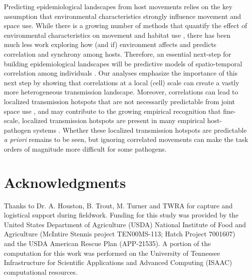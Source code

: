 \documentclass[letterpaper]{article}
\begin{document}
Predicting epidemiological landscapes from host movements relies on the key assumption that environmental characteristics strongly influence movement and space use. While there is a growing number of methods that quantify the effect of environmental characteristics on movement and habitat use \citep[reviewed in][]{Hooten2017a}, there has been much less work exploring how (and if) environment affects and predicts correlation and synchrony among hosts.  Therefore, an essential next-step for building epidemiological landscapes will be predictive models of spatio-temporal correlation among individuals \citep[e.g.][]{Brandell2021}.
Our analyses emphasize the importance of this next step by showing that correlations at a local (cell) scale can create a vastly more heterogeneous transmission landscape. Moreover, correlations can lead to localized transmission hotspots that are not necessarily predictable from joint space use \citep{Yang2023a}, and may contribute to the growing empirical recognition that fine-scale, localized transmission hotspots are present in many empirical host-pathogen systems \citep{Albery2021}.  Whether these localized transmission hotspots are predictable \emph{a priori} remains to be seen, but ignoring correlated movements can make the task orders of magnitude more difficult for some pathogens.

\section*{Acknowledgments}

Thanks to Dr. A. Houston, B. Trout, M. Turner and TWRA for capture and logistical support during fieldwork. Funding for this study was provided by the United States Department of Agriculture (USDA) National Institute of Food and Agriculture (McIntire Stennis project TEN00MS-113; Hatch Project 7001607) and the USDA American Rescue Plan (APP-21535). A portion of the computation for this work was performed on the University of Tennessee Infrastructure for Scientific Applications and Advanced Computing (ISAAC) computational resources.

\clearpage
\end{document}
